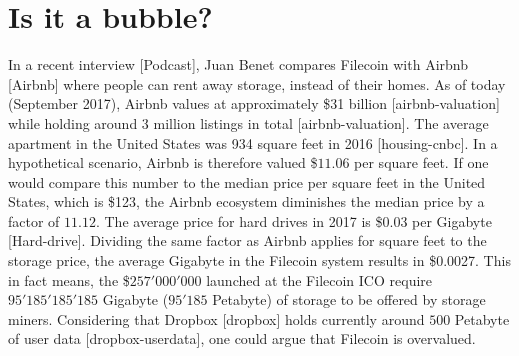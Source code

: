 \documentclass[journal]{IEEEtran}
\begin{document}
\section{Is it a bubble?}

In a recent interview [Podcast], Juan Benet compares Filecoin with Airbnb [Airbnb] where people can rent away storage, instead of their homes.
As of today (September 2017), Airbnb values at approximately \$31 billion [airbnb-valuation] while holding around 3 million listings in total [airbnb-valuation].
The average apartment in the United States was 934 square feet in 2016 [housing-cnbc].
In a hypothetical scenario, Airbnb is therefore valued \$$11.06$ per square feet. 
If one would compare this number to the median price per square feet in the United States, which is \$123, the Airbnb ecosystem diminishes the median price by a factor of $11.12$.
The average price for hard drives in 2017 is \$0.03 per Gigabyte [Hard-drive].
Dividing the same factor as Airbnb applies for square feet to the storage price, the average Gigabyte in the Filecoin system results in \$0.0027.
This in fact means, the \$$257'000'000$ launched at the Filecoin ICO require $95'185'185'185$ Gigabyte ($95'185$ Petabyte) of storage to be offered by storage miners.
Considering that Dropbox [dropbox] holds currently around $500$ Petabyte of user data [dropbox-userdata], one could argue that Filecoin is overvalued. 


\ifCLASSOPTIONcaptionsoff
  \newpage
\fi


\end{document}
